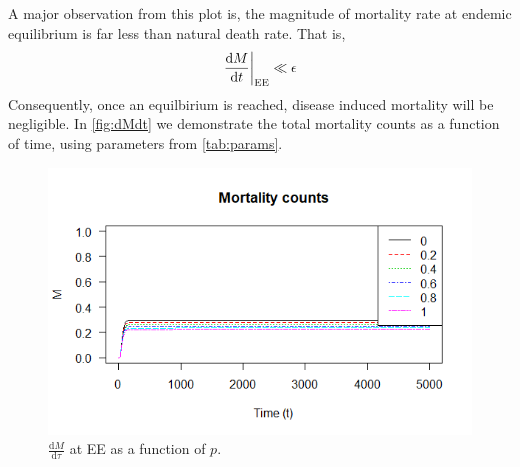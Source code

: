 \documentclass[12pt]{article}
\newcommand\dbyd[2]{\frac{\mathrm d{#1}}{\mathrm d{#2}}}
\begin{document}
A major observation from this plot is, the magnitude of mortality rate at endemic equilibrium is far less than natural death rate. That is,
\begin{equation}
\left. \dbyd{M}{t}\right|_{\rm EE} \ll \epsilon 
\end{equation}
Consequently, once an equilbirium is reached, disease induced mortality will be negligible.  In \autoref{fig:dMdt} we demonstrate the total mortality counts as a function of time, using parameters from \autoref{tab:params}.
\begin{figure}[H]
  \centering
  \includegraphics[width=1\textwidth]{Figures/Mortality_counts.png}
  \caption{$\dbyd{M}{\tau}$ at EE as a function of $p$.}
\label{fig:dMdt}
\end{figure}
\end{document}

